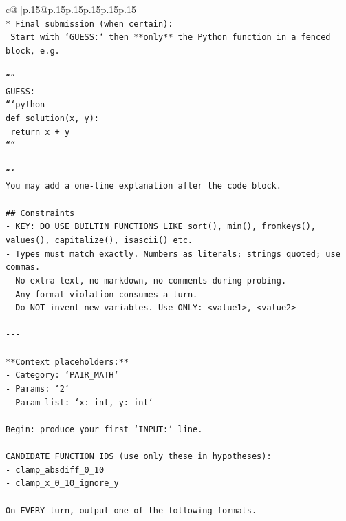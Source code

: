 \documentclass{article}
\begin{document}
{\begin{supertabular}{c@{$\;$}|p{.15\linewidth}@{}p{.15\linewidth}p{.15\linewidth}p{.15\linewidth}p{.15\linewidth}p{.15\linewidth}}
{{{\\ 
\texttt{* Final submission (when certain):} \\
\texttt{  Start with `GUESS:` then **only** the Python function in a fenced block, e.g.} \\
\\ 
\texttt{````} \\
\texttt{GUESS:} \\
\texttt{```python} \\
\texttt{def solution(x, y):} \\
\texttt{    return x + y} \\
\texttt{````} \\
\\ 
\texttt{```} \\
\texttt{You may add a one{-}line explanation after the code block.} \\
\\ 
\texttt{\#\# Constraints} \\
\texttt{{-} KEY: DO USE BUILTIN FUNCTIONS LIKE sort(), min(), fromkeys(), values(), capitalize(), isascii() etc.} \\
\texttt{{-} Types must match exactly. Numbers as literals; strings quoted; use commas.} \\
\texttt{{-} No extra text, no markdown, no comments during probing.} \\
\texttt{{-} Any format violation consumes a turn.} \\
\texttt{{-} Do NOT invent new variables. Use ONLY: <value1>, <value2>} \\
\\ 
\texttt{{-}{-}{-}} \\
\\ 
\texttt{**Context placeholders:**} \\
\texttt{{-} Category: `PAIR\_MATH`} \\
\texttt{{-} Params: `2`} \\
\texttt{{-} Param list: `x: int, y: int`} \\
\\ 
\texttt{Begin: produce your first `INPUT:` line.} \\
\\ 
\texttt{CANDIDATE FUNCTION IDS (use only these in hypotheses):} \\
\texttt{{-} clamp\_absdiff\_0\_10} \\
\texttt{{-} clamp\_x\_0\_10\_ignore\_y} \\
\\ 
\texttt{On EVERY turn, output one of the following formats.} \\
}}}
\end{supertabular}}
\end{document}
